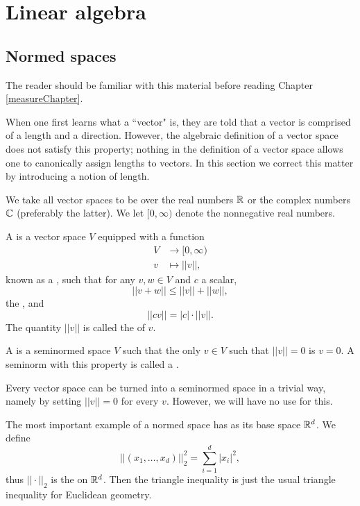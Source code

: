 \appendix
\chapter{Linear algebra}
\section{Normed spaces}
The reader should be familiar with this material before reading Chapter \ref{measureChapter}.

When one first learns what a ``vector" is, they are told that a vector is comprised of a length and a direction.
However, the algebraic definition of a vector space does not satisfy this property; nothing in the definition of a vector space allows one to canonically assign lengths to vectors.
In this section we correct this matter by introducing a notion of length.

We take all vector spaces to be over the real numbers $\mathbb{R}$ or the complex numbers $\mathbb{C}$ (preferably the latter).
We let $[0, \infty)$ denote the nonnegative real numbers.

\begin{definition}
A  is a vector space $V$ equipped with a function
\begin{align*}V &\to [0, \infty)\\
v &\mapsto ||v||,\end{align*}
known as a , such that for any $v, w \in V$ and $c$ a scalar,
\[||v + w|| \leq ||v|| + ||w||,\]
the , and
\[||cv|| = |c|\cdot||v||.\]
The quantity $||v||$ is called the  of $v$.

A  is a seminormed space $V$ such that the only $v \in V$ such that $||v|| = 0$ is $v = 0$.
A seminorm with this property is called a .
\end{definition}

\begin{example}
Every vector space can be turned into a seminormed space in a trivial way, namely by setting $||v|| = 0$ for every $v$.
However, we will have no use for this.
\end{example}

\begin{example}
The most important example of a normed space has as its base space $\mathbb{R}^d$.
We define
\[||(x_1, \dots, x_d)||_2^2 = \sum_{i=1}^{d} |x_i|^2,\]
thus $||\cdot||_2$ is the  on $\mathbb{R}^d$.
Then the triangle inequality is just the usual triangle inequality for Euclidean geometry.
\end{example}


